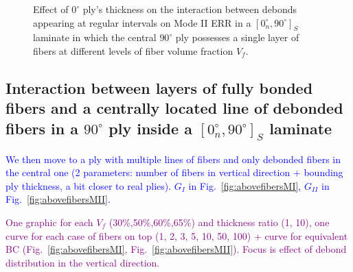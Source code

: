 \documentclass[review]{elsarticle}
\begin{document}
\begin{figure}[!h]
\caption{Effect of $0^{\circ}$ ply's thickness on the interaction between debonds appearing at regular intervals on Mode II ERR in a $\left[0^{\circ}_{n}, 90^{\circ}\right]_{S}$ laminate in which the central $90^{\circ}$ ply possesses a single layer of fibers at different levels of fiber volume fraction $V_{f}$.}\label{fig:sidefibersthicknessMII}
\end{figure}

\subsection{Interaction between layers of fully bonded fibers and a centrally located line of debonded fibers in a $90^{\circ}$ ply inside a $\left[0^{\circ}_{n}, 90^{\circ}\right]_{S}$ laminate}

\textcolor{blue}{We then move to a ply with multiple lines of fibers and only debonded fibers in the central one (2 parameters: number of fibers in vertical direction + bounding ply thickness, a bit closer to real plies).  $G_{I}$ in Fig.~\ref{fig:abovefibersMI}, $G_{II}$ in Fig.~\ref{fig:abovefibersMII}.}

\textcolor{purple}{One graphic for each $V_{f}$ (30\%,50\%,60\%,65\%) and thickness ratio (1, 10), one curve for each case of fibers on top (1, 2, 3, 5, 10, 50, 100) + curve for equivalent BC (Fig.~\ref{fig:abovefibersMI}, Fig.~\ref{fig:abovefibersMII}). Focus is effect of debond distribution in the vertical direction.}\\
\end{document}
